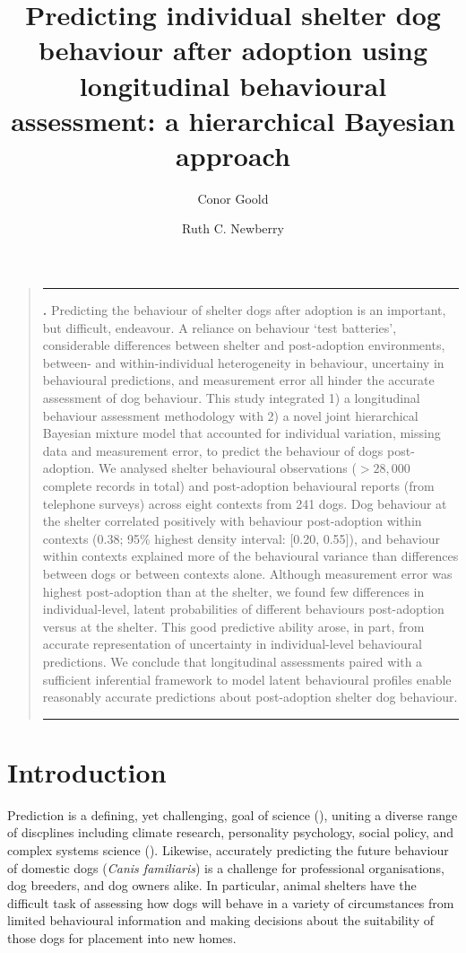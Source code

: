 \documentclass[12pt]{article}
\title{Predicting individual shelter dog behaviour after adoption using longitudinal behavioural assessment: a hierarchical Bayesian approach}
\author[1,2]{Conor Goold}
\author[2]{Ruth C. Newberry}
\affil[1]{\small{School of Biology, Faculty of Biological Sciences, University of Leeds, UK, LS2 9JT}}
\affil[2]{\small{Department of Animal and Aquacultural Sciences, Faculty of Biosciences, Norwegian University of Life Sciences, \r{A}s, Norway}}
\date{}
\renewenvironment{abstract}
{\begin{quote}
\small
\noindent \rule{\linewidth}{.5pt}\par{\bfseries \abstractname.}}
{\medskip\noindent \rule{\linewidth}{.5pt}
\end{quote}
}
\begin{document}
\linenumbers
\modulolinenumbers[5]

\maketitle

\begin{abstract}
  \small
  Predicting the behaviour of shelter dogs after adoption is an important, but difficult, endeavour. A reliance on behaviour `test batteries', considerable differences between shelter and post-adoption environments, between- and within-individual heterogeneity in behaviour, uncertainy in behavioural predictions, and measurement error all hinder the accurate assessment of dog behaviour.
  This study integrated 1) a longitudinal behaviour assessment methodology with 2) a novel joint hierarchical Bayesian mixture model that accounted for individual variation, missing data and measurement error, to predict the behaviour of dogs post-adoption. We analysed shelter behavioural observations ($> 28,000$ complete records in total) and post-adoption behavioural reports (from telephone surveys) across eight contexts from 241 dogs. Dog behaviour at the shelter correlated positively with behaviour post-adoption within contexts (0.38; 95\% highest density interval: [0.20, 0.55]), and behaviour within contexts explained more of the behavioural variance than differences between dogs or between contexts alone.
  Although measurement error was highest post-adoption than at the shelter, we found few differences in individual-level, latent probabilities of different behaviours post-adoption versus at the shelter. This good predictive ability arose, in part, from accurate representation of uncertainty in individual-level behavioural predictions. We conclude that longitudinal assessments paired with a sufficient inferential framework to model latent behavioural profiles enable reasonably accurate predictions about post-adoption shelter dog behaviour.\\
\end{abstract}
\newpage

\section{Introduction}
Prediction is a defining, yet challenging, goal of science (\cite{hofstadter1951}), uniting a diverse range of discplines including climate research, personality psychology, social policy, and complex systems science (\cite{sarewitz1999}). Likewise, accurately predicting the future behaviour of domestic dogs (\textit{Canis familiaris}) is a challenge for professional organisations, dog breeders, and dog owners alike. In particular, animal shelters have the difficult task of assessing how dogs will behave in a variety of circumstances from limited behavioural information and making decisions about the suitability of those dogs for placement into new homes.
\end{document}
